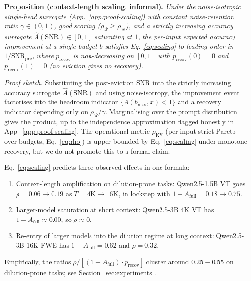 \documentclass{article}
\begin{document}
\textbf{Proposition (context-length scaling, informal).} \emph{Under the
noise-isotropic single-head surrogate (App.~\ref{app:proof-scaling}) with
constant noise-retention ratio $\gamma \in (0, 1)$, good scoring
($\rho_{\mathcal{R}} \ge \rho_{\mathcal{N}}$), and a strictly increasing
accuracy surrogate $\hat A(\mathrm{SNR}) \in [0, 1]$ saturating at $1$, the
per-input expected accuracy improvement at a single budget $b$ satisfies
Eq.~\eqref{eq:scaling} to leading order in $1/\mathrm{SNR}_{\mathrm{pre}}$,
where $p_{\mathrm{recov}}$ is non-decreasing on $[0, 1]$ with
$p_{\mathrm{recov}}(0) = 0$ and $p_{\mathrm{recov}}(1) = 0$ (no eviction
gives no recovery).}

\emph{Proof sketch.} Substituting the post-eviction SNR into the strictly
increasing accuracy surrogate $\hat A(\mathrm{SNR})$ and using
noise-isotropy, the improvement event factorises into the headroom
indicator $\{A(b_{\max}, x) < 1\}$ and a recovery indicator depending only
on $\rho_{\mathcal{R}} / \gamma$. Marginalising over the prompt
distribution gives the product, up to the independence approximation
flagged honestly in App.~\ref{app:proof-scaling}. The operational metric
$\rho_{\mathrm{KV}}$ (per-input strict-Pareto over budgets,
Eq.~\eqref{eq:rho}) is upper-bounded by Eq.~\eqref{eq:scaling} under
monotone recovery, but we do not promote this to a formal claim.

Eq.~\eqref{eq:scaling} predicts three observed effects in one formula:
\begin{enumerate}
\item Context-length amplification on dilution-prone tasks: Qwen2.5-1.5B
VT goes $\rho = 0.06 \to 0.19$ as $T = 4\mathrm{K} \to 16\mathrm{K}$, in
lockstep with $1 - A_{\mathrm{full}} = 0.18 \to 0.75$.
\item Larger-model saturation at short context: Qwen2.5-3B 4K VT has
$1 - A_{\mathrm{full}} \approx 0.00$, so $\rho \approx 0$.
\item Re-entry of larger models into the dilution regime at long
context: Qwen2.5-3B 16K FWE has $1 - A_{\mathrm{full}} = 0.62$ and
$\rho = 0.32$.
\end{enumerate}
Empirically, the ratios $\rho / [(1-A_{\mathrm{full}}) \cdot p_{\mathrm{recov}}]$
cluster around $0.25 - 0.55$ on dilution-prone tasks; see
Section~\ref{sec:experiments}.
\end{document}
